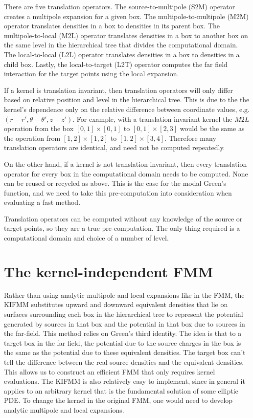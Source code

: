 \documentclass[11pt, oneside]{article}   	%
\begin{document}
There are five translation operators. The source-to-multipole (S2M) operator creates a multipole expansion for a given box. The multipole-to-multipole (M2M) operator translates densities in a box to densities in its parent box. The multipole-to-local (M2L) operator translates densities in a box to another box on the same level in the hierarchical tree that divides the computational domain. The local-to-local (L2L) operator translates densities in a box to densities in a child box. Lastly, the local-to-target (L2T) operator computes the far field interaction for the target points using the local expansion.

If a kernel is translation invariant, then translation operators will only differ based on relative position and level in the hierarchical tree. This is due to the the kernel's dependence only on the relative difference between coordinate values, e.g. $(r-r',\theta-\theta',z-z')$. For example, with a translation invariant kernel the $M2L$ operation from the box $[0,1]\times[0,1]$ to $[0,1]\times[2,3]$ would be the same as the operation from $[1,2]\times[1,2]$ to $[1,2]\times[3,4]$. Therefore many translation operators are identical, and need not be computed repeatedly.

On the other hand, if a kernel is not translation invariant, then every translation operator for every box in the computational domain needs to be computed. None can be reused or recycled as above. This is the case for the modal Green's function, and we need to take this pre-computation into consideration when evaluating a fast method.

Translation operators can be computed without any knowledge of the source or target points, so they are a true pre-computation. The only thing required is a computational domain and choice of a number of level.

\section{The kernel-independent FMM}
Rather than using analytic multipole and local expansions like in the FMM, the KIFMM substitutes upward and downward equivalent densities that lie on surfaces surrounding each box in the hierarchical tree to represent the potential generated by sources in that box and the potential in that box due to sources in the far-field. This method relies on Green's third identity. The idea is that to a target box in the far field, the potential due to the source charges in the box is the same as the potential due to these equivalent densities. The target box can't tell the difference between the real source densities and the equivalent densities. This allows us to construct an efficient FMM that only requires kernel evaluations. The KIFMM is also relatively easy to implement, since in general it applies to an arbitrary kernel that is the fundamental solution of some elliptic PDE. To change the kernel in the original FMM, one would need to develop analytic multipole and local expansions.
\end{document}
